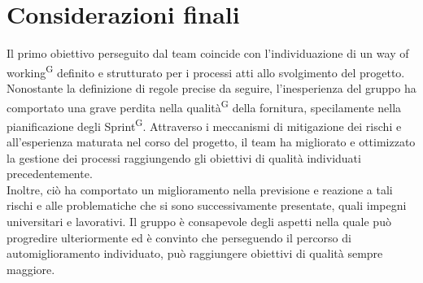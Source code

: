 \documentclass[8pt]{article}
\newcommand{\glossterm}[1]{#1\textsuperscript{G}} %
\begin{document}
\section{Considerazioni finali}\label{sec:considerazioni}
Il primo obiettivo perseguito dal team coincide con l'individuazione di un \glossterm{way of working} definito e strutturato per i processi atti allo svolgimento del progetto.\\
Nonostante la definizione di regole precise da seguire, l'inesperienza del gruppo ha comportato una grave perdita nella \glossterm{qualità} della fornitura, specilamente nella pianificazione degli \glossterm{Sprint}.
Attraverso i meccanismi di mitigazione dei rischi e all'esperienza maturata nel corso del progetto, il team ha migliorato e ottimizzato la gestione dei processi raggiungendo gli obiettivi di qualità individuati precedentemente.\\
Inoltre, ciò ha comportato un miglioramento nella previsione e reazione a tali rischi e alle problematiche che si sono successivamente presentate, quali impegni universitari e lavorativi.
Il gruppo è consapevole degli aspetti nella quale può progredire ulteriormente ed è convinto che perseguendo il percorso di automiglioramento individuato, può raggiungere obiettivi di qualità sempre maggiore.
\end{document}
